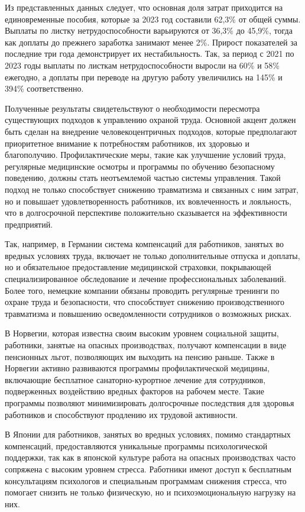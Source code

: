 \begin{multicols}{2}

Из представленных данных следует, что основная доля затрат приходится на
единовременные пособия, которые за 2023 год составили 62,3\% от общей
суммы. Выплаты по листку нетрудоспособности варьируются от 36,3\% до
45,9\%, тогда как доплаты до прежнего заработка занимают менее 2\%.
Прирост показателей за последние три года демонстрирует их
нестабильность. Так, за период с 2021 по 2023 годы выплаты по листкам
нетрудоспособности выросли на 60\% и 58\% ежегодно, а доплаты при
переводе на другую работу увеличились на 145\% и 394\% соответственно.

Полученные результаты свидетельствуют о необходимости пересмотра
существующих подходов к управлению охраной труда. Основной акцент должен
быть сделан на внедрение человекоцентричных подходов, которые
предполагают приоритетное внимание к потребностям работников, их
здоровью и благополучию. Профилактические меры, такие как улучшение
условий труда, регулярные медицинские осмотры и программы по обучению
безопасному поведению, должны стать неотъемлемой частью системы
управления. Такой подход не только способствует снижению травматизма и
связанных с ним затрат, но и повышает удовлетворенность работников, их
вовлеченность и лояльность, что в долгосрочной перспективе положительно
сказывается на эффективности предприятий.

Так, например, в Германии система компенсаций для работников, занятых во
вредных условиях труда, включает не только дополнительные отпуска и
доплаты, но и обязательное предоставление медицинской страховки,
покрывающей специализированное обследование и лечение профессиональных
заболеваний. Более того, немецкие компании обязаны проводить регулярные
тренинги по охране труда и безопасности, что способствует снижению
производственного травматизма и повышению осведомленности сотрудников о
возможных рисках.

В Норвегии, которая известна своим высоким уровнем социальной защиты,
работники, занятые на опасных производствах, получают компенсации в виде
пенсионных льгот, позволяющих им выходить на пенсию раньше. Также в
Норвегии активно развиваются программы профилактической медицины,
включающие бесплатное санаторно-курортное лечение для сотрудников,
подверженных воздействию вредных факторов на рабочем месте. Такие
программы позволяют минимизировать долгосрочные последствия для здоровья
работников и способствуют продлению их трудовой активности.

В Японии для работников, занятых во вредных условиях, помимо стандартных
компенсаций, предоставляются уникальные программы психологической
поддержки, так как в японской культуре работа на опасных производствах
часто сопряжена с высоким уровнем стресса. Работники имеют доступ к
бесплатным консультациям психологов и специальным программам снижения
стресса, что помогает снизить не только физическую, но и
психоэмоциональную нагрузку на них.


\end{multicols}
